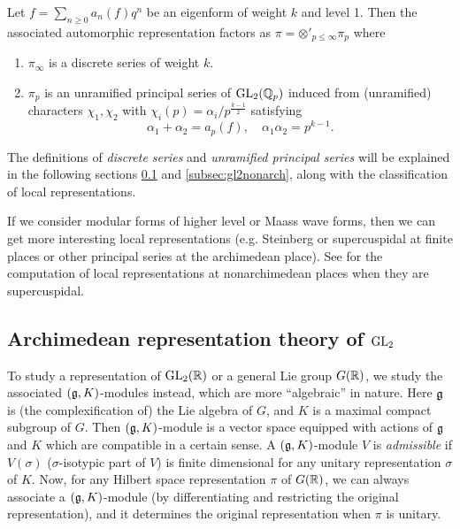 \begin{theorem}
\label{thm:gl2factor}
Let $f = \sum_{n \ge 0} a_n(f) q^n$ be an eigenform of weight $k$ and level 1.
Then the associated automorphic representation factors as $\pi =  \otimes'_{p \le \infty} \pi_{p}$ where
\begin{enumerate}
    \item $\pi_\infty$ is a discrete series of weight $k$.
    \item $\pi_p$ is an unramified principal series of $\mathrm{GL}_2(\mathbb{Q}_p)$ induced from (unramified) characters $\chi_1, \chi_2$ with $\chi_i(p) = \alpha_i / p^{\frac{k - 1}{2}}$ satisfying
    $$
        \alpha_1 + \alpha_2 = a_p(f), \quad \alpha_1 \alpha_2 = p^{k-1}.
    $$
\end{enumerate}
\end{theorem}

The definitions of \emph{discrete series} and \emph{unramified principal series} will be explained in the following sections \ref{subsec:gl2arch} and \ref{subsec:gl2nonarch}, along with the classification of local representations.

If we consider modular forms of higher level or Maass wave forms, then we can get more interesting local representations (e.g. Steinberg or supercuspidal at finite places or other principal series at the archimedean place).
See \cite{loeffler2012computation} for the computation of local representations at nonarchimedean places when they are supercuspidal.



\subsection{Archimedean representation theory of $\mathrm{GL}_2$}
\label{subsec:gl2arch}

To study a representation of $\mathrm{GL}_2(\mathbb{R})$ or a general Lie group $G(\mathbb{R})$, we study the associated $(\mathfrak{g}, K)$-modules instead, which are more ``algebraic'' in nature.
Here $\mathfrak{g}$ is (the complexification of) the Lie algebra of $G$, and $K$ is a maximal compact subgroup of $G$.
Then $(\mathfrak{g}, K)$-module is a vector space equipped with actions of $\mathfrak{g}$ and $K$ which are compatible in a certain sense.
A $(\mathfrak{g}, K)$-module $V$ is \emph{admissible} if $V(\sigma)$ ($\sigma$-isotypic part of $V$) is finite dimensional for any unitary representation $\sigma$ of $K$.
Now, for any Hilbert space representation $\pi$ of $G(\mathbb{R})$, we can always associate a $(\mathfrak{g}, K)$-module (by differentiating and restricting the original representation), and it determines the original representation when $\pi$ is unitary.

